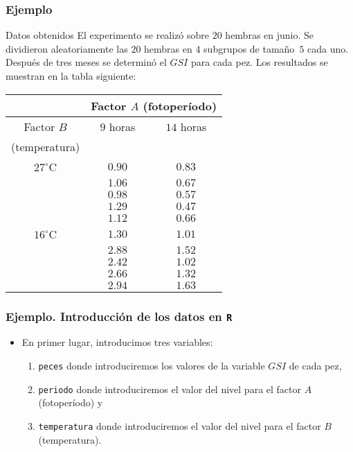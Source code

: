 \begin{frame}
\frametitle{Ejemplo}
\begin{block}{Datos obtenidos}
El experimento se realizó sobre $20$ hembras en junio. Se dividieron aleatoriamente las $20$ hembras en $4$ subgrupos de tamaño~$5$ cada uno. Después de tres meses se determinó el $GSI$ para cada pez. Los resultados se muestran en la tabla siguiente:
{\footnotesize
\begin{center}
\begin{tabular}{ccc}
\hline
&\multicolumn{2}{c}{Factor $A$ (fotoperíodo)}\\\hline
Factor $B$&$9$ horas&$14$ horas\\
(temperatura)&&\\\hline
$27^\circ$C&$0.90$&$0.83$\\
&$1.06$&$0.67$\\
&$0.98$&$0.57$\\
&$1.29$&$0.47$\\
&$1.12$&$0.66$\\\hline
$16^\circ$C&$1.30$&$1.01$\\
&$2.88$&$1.52$\\
&$2.42$&$1.02$\\
&$2.66$&$1.32$\\
&$2.94$&$1.63$\\\hline
\end{tabular}
\end{center}}
\end{block}
\end{frame}
\begin{frame}
\frametitle{Ejemplo. Introducción de los datos en {\tt R}}
\begin{itemize}
\item<2-> En primer lugar, introducimos tres variables:
\begin{enumerate}
\item<3-> {\tt peces} donde introduciremos los valores de la variable $GSI$ de cada pez,
\item<4-> {\tt periodo} donde introduciremos el valor del nivel para el factor $A$ (fotoperíodo) y
\item<5-> {\tt temperatura} donde introduciremos el valor del nivel para el factor $B$ (temperatura).
\end{enumerate}
\end{itemize}
\end{frame}
